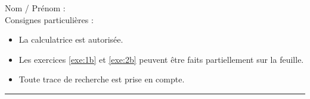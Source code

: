 \setcounter{Exercise}{0}

\newpage

\pagestyle{fancy}
\fancyhead[R]{\today}

\null\vspace{-30pt}
Nom / Prénom : \\

Consignes particulières : 
\begin{itemize}[label=$\bullet$]
	\item 
	La calculatrice est {autorisée}.
	\item 
	Les exercices \ref{exe:1b} et \ref{exe:2b} peuvent être faits partiellement sur la feuille.
	\item 
	Toute trace de recherche est prise en compte.
\end{itemize}

\hrule


